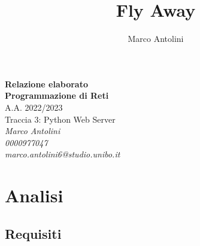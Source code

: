 \documentclass[12pt]{article}
\title{Fly Away}
\author{Marco Antolini}
\begin{document}
\begin{center}
    \vspace*{\fill}
    \Huge\textbf{Relazione elaborato} \\
    \Huge\textbf{Programmazione di Reti} \\
    \vspace*{\fill}
    \Large{A.A. 2022/2023} \\
    \Large{Traccia 3: Python Web Server} \\
    \vspace*{\fill}
    \Large\textsl{Marco Antolini} \\
    \large\textsl{0000977047} \\
    \large\textsl{marco.antolini6@studio.unibo.it}
    \vspace*{\fill}
\end{center}

\newpage

\tableofcontents

\newpage


\section{Analisi}

\subsection*{Requisiti}
\end{document}
